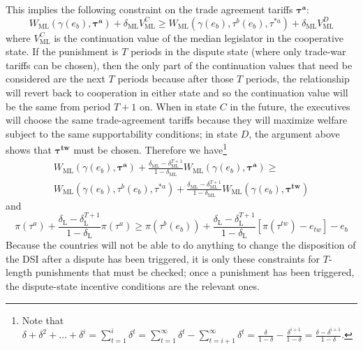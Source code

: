 \documentclass[authoryear, review]{elsarticle}
\newcommand{\bta}{\bm{\tau^a}}
\newcommand{\ga}{\gamma}
\newcommand{\btw}{\bm{\tau^{tw}}}
\newcommand{\de}{\delta}
\begin{document}
This implies the following constraint on the trade agreement tariffs $\bta$:
\[
  W_\text{ML}(\ga(e_b),\bta) + \de_\text{ML} V^C_\text{ML} \geq W_\text{ML}(\ga(e_b),\tau^b(e_b),\tau^{*a}) + \de_\text{ML} V^D_\text{ML}
\]
where $V^C_\text{ML}$ is the continuation value of the median legislator in the cooperative state. If the punishment is $T$ periods in the dispute state (where only trade-war tariffs can be chosen), then the only part of the continuation values that need be considered are the next $T$ periods because after those $T$ periods, the relationship will revert back to cooperation in either state and so the continuation value will be the same from period $T+1$ on. When in state $C$ in the future, the executives will choose the same trade-agreement tariffs because they will maximize welfare subject to the  same supportability conditions; in state $D$, the argument above shows that $\btw$ must be chosen. Therefore we have\footnote{Note that $\de + \de^2 + \ldots + \de^i = \sum_{t=1}^i \de^t= \sum_{t=1}^\infty \de^t - \sum_{t=i+1}^\infty \de^t = \frac{\de}{1-\de} - \frac{\de^{i+1}}{1-\de} = \frac{\de - \de^{i+1}}{1-\de} $.}
\begin{multline}
  W_\text{ML}(\ga(e_b),\bta) + \frac{\de_\text{ML} - \de_\text{ML}^{T+1}}{1-\de_\text{ML}} W_\text{ML}(\ga(e_b),\bta) \geq \\
	W_\text{ML}(\ga(e_b),\tau^b(e_b),\tau^{*a}) + \frac{\de_\text{ML} - \de_\text{ML}^{T+1}}{1-\de_\text{ML}} W_\text{ML}(\ga(e_b),\btw)
  \label{ine:leg}
\end{multline}
and
\begin{equation}
  \pi(\tau^a) + \frac{\de_\text{L} - \de_\text{L}^{T+1}}{1-\de_\text{L}} \pi(\tau^a) \geq \pi(\tau^b(e_b)) + \frac{\de_\text{L} - \de_\text{L}^{T+1}}{1-\de_\text{L}} \left[\pi(\tau^{tw}) - e_{tw} \right] - e_b
  \label{ine:lob}
\end{equation}
Because the countries will not be able to do anything to change the disposition of the DSI after a dispute has been triggered, it is only these constraints for $T$-length punishments that must be checked; once a punishment has been triggered, the dispute-state incentive conditions are the relevant ones.
\end{document}
